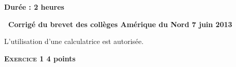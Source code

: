 \documentclass[10pt]{article}
\begin{document}
\setlength\parindent{0mm}
\renewcommand \footrulewidth{.2pt}
\pagestyle{fancy}
\thispagestyle{empty}
\begin{center}
\textbf{Durée : 2 heures}

\vspace{0,25cm}

{\Large \textbf{\decofourleft~Corrigé du brevet des collèges Amérique du Nord 7 juin 2013~\decofourright}}

\vspace{0,25cm}

L'utilisation d'une calculatrice est autorisée.

\end{center}
 
\vspace{0,25cm}

\textbf{\textsc{Exercice 1} \hfill 4 points}

\medskip

%
 
\end{document}

